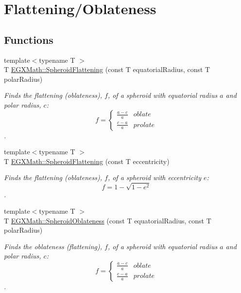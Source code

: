 \hypertarget{group___e_g_x_math-_geometry-3_d-_spheroid-_flattening}{}\section{Flattening/\+Oblateness}
\label{group___e_g_x_math-_geometry-3_d-_spheroid-_flattening}
\subsection*{Functions}
\begin{DoxyCompactItemize}
\item 
{\footnotesize template$<$typename T $>$ }\\T \mbox{\hyperlink{group___e_g_x_math-_geometry-3_d-_spheroid-_flattening_ga640f4bcd86aa4c378819bffda31c0852}{E\+G\+X\+Math\+::\+Spheroid\+Flattening}} (const T equatorial\+Radius, const T polar\+Radius)
\begin{DoxyCompactList}\small\item\em Finds the flattening (oblateness), $f$, of a spheroid with equatorial radius $a$ and polar radius, $c$\+: \[ f =\begin{cases} \frac{a-c}{a}{} & oblate \\ \frac{c-a}{a} & prolate \end{cases} \]. \end{DoxyCompactList}\item 
{\footnotesize template$<$typename T $>$ }\\T \mbox{\hyperlink{group___e_g_x_math-_geometry-3_d-_spheroid-_flattening_ga9822b6e1025edbf7d272949547c53511}{E\+G\+X\+Math\+::\+Spheroid\+Flattening}} (const T eccentricity)
\begin{DoxyCompactList}\small\item\em Finds the flattening (oblateness), $f$, of a spheroid with eccentricity $e$\+: \[ f = 1 - \sqrt{1-e^2} \]. \end{DoxyCompactList}\item 
{\footnotesize template$<$typename T $>$ }\\T \mbox{\hyperlink{group___e_g_x_math-_geometry-3_d-_spheroid-_flattening_ga8f547f5dd10721862b602c7769eb6116}{E\+G\+X\+Math\+::\+Spheroid\+Oblateness}} (const T equatorial\+Radius, const T polar\+Radius)
\begin{DoxyCompactList}\small\item\em Finds the oblateness (flattening), $f$, of a spheroid with equatorial radius $a$ and polar radius, $c$\+: \[ f =\begin{cases} \frac{a-c}{a}{} & oblate \\ \frac{c-a}{a} & prolate \end{cases} \]. \end{DoxyCompactList}\item 

\end{DoxyCompactItemize}
